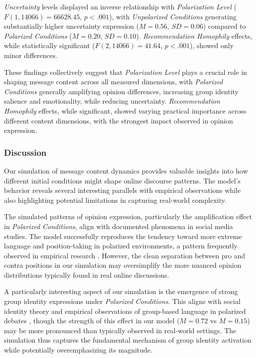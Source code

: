 \emph{Uncertainty} levels displayed an inverse relationship with \emph{Polarization Level} ($F(1, 14066) = 66628.45$, $p < .001$), with \emph{Unpolarized Conditions} generating substantially higher uncertainty expression ($M = 0.56$, $SD = 0.06$) compared to \emph{Polarized Conditions} ($M = 0.20$, $SD = 0.10$). \emph{Recommendation Homophily} effects, while statistically significant ($F(2, 14066) = 41.64$, $p < .001$), showed only minor differences.

These findings collectively suggest that \emph{Polarization Level} plays a crucial role in shaping message content across all measured dimensions, with \emph{Polarized Conditions} generally amplifying opinion differences, increasing group identity salience and emotionality, while reducing uncertainty. \emph{Recommendation Homophily} effects, while significant, showed varying practical importance across different content dimensions, with the strongest impact observed in opinion expression.

\subsubsection{Discussion}

Our simulation of message content dynamics provides valuable insights into how different initial conditions might shape online discourse patterns. The model's behavior reveals several interesting parallels with empirical observations while also highlighting potential limitations in capturing real-world complexity.

The simulated patterns of opinion expression, particularly the amplification effect in \emph{Polarized Conditions}, align with documented phenomena in social media studies. The model successfully reproduces the tendency toward more extreme language and position-taking in polarized environments, a pattern frequently observed in empirical research \citep{wahlstrom_dynamics_2021, simchon_troll_2022}. However, the clean separation between pro and contra positions in our simulation may oversimplify the more nuanced opinion distributions typically found in real online discussions.

A particularly interesting aspect of our simulation is the emergence of strong group identity expressions under \emph{Polarized Conditions}. This aligns with social identity theory \citep{tajfel_integrative_1979, huddy_social_2001} and empirical observations of group-based language in polarized debates \citep{albertson_dog-whistle_2015,ruiz-sanchez_us_2019,bliuc_online_2021,iyengar_fear_2015}, though the strength of this effect in our model ($M = 0.72$ vs $M = 0.15$) may be more pronounced than typically observed in real-world settings. The simulation thus captures the fundamental mechanism of group identity activation while potentially overemphasizing its magnitude.

